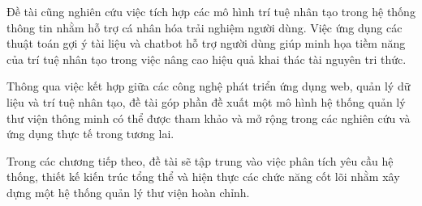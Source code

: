 Đề tài cũng nghiên cứu việc tích hợp các mô hình trí tuệ nhân tạo trong hệ thống thông tin nhằm hỗ trợ cá nhân hóa trải nghiệm người dùng. Việc ứng dụng các thuật toán gợi ý tài liệu và chatbot hỗ trợ người dùng giúp minh họa tiềm năng của trí tuệ nhân tạo trong việc nâng cao hiệu quả khai thác tài nguyên tri thức.

Thông qua việc kết hợp giữa các công nghệ phát triển ứng dụng web, quản lý dữ liệu và trí tuệ nhân tạo, đề tài góp phần đề xuất một mô hình hệ thống quản lý thư viện thông minh có thể được tham khảo và mở rộng trong các nghiên cứu và ứng dụng thực tế trong tương lai.

Trong các chương tiếp theo, đề tài sẽ tập trung vào việc phân tích yêu cầu hệ thống, thiết kế kiến trúc tổng thể và hiện thực các chức năng cốt lõi nhằm xây dựng một hệ thống quản lý thư viện hoàn chỉnh.